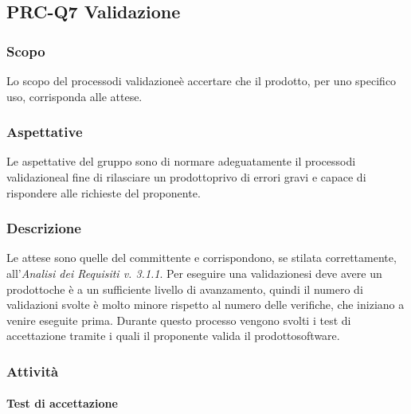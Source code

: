 \subsection{PRC-Q7 Validazione}

\subsubsection{Scopo}
Lo scopo del processo\glosp di validazione\glosp è accertare che il prodotto\glo, per uno specifico uso, corrisponda alle attese.

\subsubsection{Aspettative}
Le aspettative del gruppo sono di normare adeguatamente il processo\glosp di validazione\glosp al fine di rilasciare un prodotto\glosp privo di errori gravi e capace di rispondere alle richieste del proponente.

\subsubsection{Descrizione}
Le attese sono quelle del committente e corrispondono, se stilata correttamente, all'\textit{Analisi dei Requisiti v. 3.1.1}. 
Per eseguire una validazione\glosp si deve avere un prodotto\glosp che è a un sufficiente livello di avanzamento, quindi il numero di validazioni svolte è molto minore rispetto al numero delle verifiche, che iniziano a venire eseguite prima.
Durante questo processo vengono svolti i test di accettazione tramite i quali il proponente valida il prodotto\glosp software.

\subsubsection{Attività}
	\paragraph{Test di accettazione}
